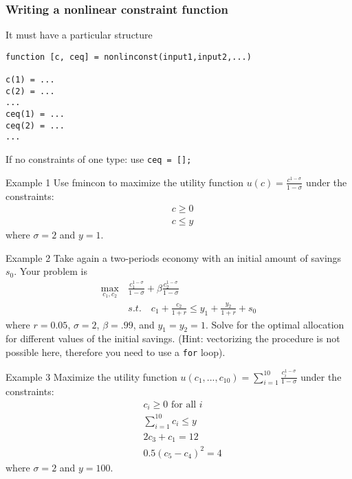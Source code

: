 \documentclass[show notes]{beamer}%
\begin{document}
\begin{frame}[fragile]
\frametitle{Writing a nonlinear constraint function} \pause
It must have a particular structure

\begin{lstlisting}
function [c, ceq] = nonlinconst(input1,input2,...)

c(1) = ...
c(2) = ...
...
ceq(1) = ...
ceq(2) = ...
...
\end{lstlisting} \pause
If no constraints of one type: use \texttt{ceq = [];}

\end{frame}

\begin{frame}[fragile]{Example 1}
Use fmincon to maximize the utility function $u(c) = \frac{c^{1-\sigma}}{1-\sigma}$ under the constraints:
    \begin{align*}
    & c \geq 0 \\
    & c \leq y
    \end{align*}
    where $\sigma = 2$ and $y = 1$.
\end{frame}




\begin{frame}[fragile]{Example 2}
Take again a two-periods economy with an initial amount of savings $s_0$. Your problem is
\begin{align*}
 \max_{c_1,c_2} \, & \frac{c_1^{1-\sigma}}{1-\sigma} + \beta \frac{c_2^{1-\sigma}}{1-\sigma} \\
& s.t. \quad  c_1 + \frac{c_2}{1+r} \leq y_1 + \frac{y_2}{1+r} + s_0
\end{align*}
where $r=0.05$, $\sigma = 2$, $\beta = .99$, and $y_1 = y_2 = 1$. Solve for the optimal allocation for different values of the initial savings. (Hint: vectorizing the procedure is not possible here, therefore you need to use a \texttt{for} loop).
\end{frame}


\begin{frame}[fragile]{Example 3}
Maximize the utility function $u(c_1,...,c_{10}) =\sum_{i=1}^{10} \frac{ c_i^{1-\sigma}}{1-\sigma}$ under the constraints:
    \begin{align*}
    & c_i \geq 0 \text{ for all } i \\
    & \sum_{i=1}^{10} c_i \leq  y \\
    & 2c_3 + c_1 = 12 \\
    & 0.5 ( c_{5} - c_4)^{2} = 4
    \end{align*}
    where $\sigma = 2$ and $y = 100$.
\end{frame}
\end{document}
